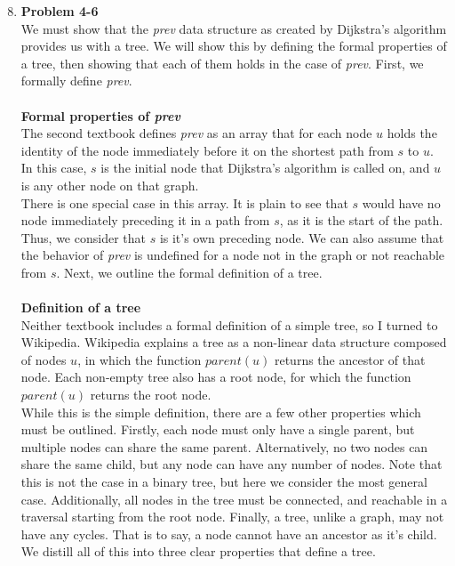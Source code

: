 \documentclass{article}
\begin{document}
\begin{enumerate}
	\setcounter{enumi}{7}
	\item \textbf{Problem 4-6}
\\ We must show that the \emph{prev} data structure as created by Dijkstra's algorithm provides us with a tree. We will show this by defining the formal properties of a tree, then showing that each of them holds in the case of \emph{prev}. First, we formally define \emph{prev}. 
\\\\ \textbf{Formal properties of \emph{prev}}
\\ The second textbook defines \emph{prev} as an array that for each node $u$ holds the identity of the node immediately before it on the shortest path from $s$ to $u$. In this case, $s$ is the initial node that Dijkstra's algorithm is called on, and $u$ is any other node on that graph. 
\\ There is one special case in this array. It is plain to see that $s$ would have no node immediately preceding it in a path from $s$, as it is the start of the path. Thus, we consider that $s$ is it's own preceding node. We can also assume that the behavior of \emph{prev} is undefined for a node not in the graph or not reachable from $s$. Next, we outline the formal definition of a tree.
\\ \\ \textbf{Definition of a tree}
\\ Neither textbook includes a formal definition of a simple tree, so I turned to Wikipedia. Wikipedia explains a tree as a non-linear data structure composed of nodes $u$, in which the function $parent(u)$ returns the ancestor of that node. Each non-empty tree also has a root node, for which the function $parent(u)$ returns the root node.
\\ While this is the simple definition, there are a few other properties which must be outlined. Firstly, each node must only have a single parent, but multiple nodes can share the same parent. Alternatively, no two nodes can share the same child, but any node can have any number of nodes. Note that this is not the case in a binary tree, but here we consider the most general case. Additionally, all nodes in the tree must be connected, and reachable in a traversal starting from the root node. Finally, a tree, unlike a graph, may not have any cycles. That is to say, a node cannot have an ancestor as it's child. We distill all of this into three clear properties that define a tree.
\begin{enumerate}

\end{enumerate}
\end{enumerate}
\end{document}
